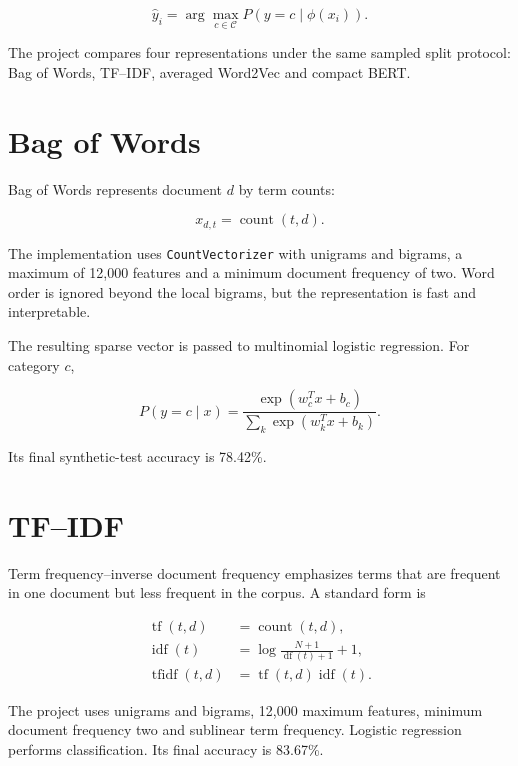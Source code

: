 \documentclass[12pt,a4paper]{report}
\newcommand{\code}[1]{\texttt{#1}}
\begin{document}
\begin{equation}
\hat{y}_i=\arg\max_{c\in\mathcal{C}} P(y=c\mid\phi(x_i)).
\end{equation}

The project compares four representations under the same sampled split protocol: Bag of Words, TF--IDF, averaged Word2Vec and compact BERT.

\section{Bag of Words}

Bag of Words represents document $d$ by term counts:

\begin{equation}
x_{d,t}=\operatorname{count}(t,d).
\end{equation}

The implementation uses \code{CountVectorizer} with unigrams and bigrams, a maximum of 12,000 features and a minimum document frequency of two. Word order is ignored beyond the local bigrams, but the representation is fast and interpretable.

The resulting sparse vector is passed to multinomial logistic regression. For category $c$,

\begin{equation}
P(y=c\mid x)=\frac{\exp(w_c^Tx+b_c)}{\sum_k\exp(w_k^Tx+b_k)}.
\end{equation}

Its final synthetic-test accuracy is 78.42\%.

\section{TF--IDF}

Term frequency--inverse document frequency emphasizes terms that are frequent in one document but less frequent in the corpus. A standard form is

\begin{align}
\operatorname{tf}(t,d)&=\operatorname{count}(t,d),\\
\operatorname{idf}(t)&=\log\frac{N+1}{\operatorname{df}(t)+1}+1,\\
\operatorname{tfidf}(t,d)&=\operatorname{tf}(t,d)\operatorname{idf}(t).
\end{align}

The project uses unigrams and bigrams, 12,000 maximum features, minimum document frequency two and sublinear term frequency. Logistic regression performs classification. Its final accuracy is 83.67\%.
\end{document}
